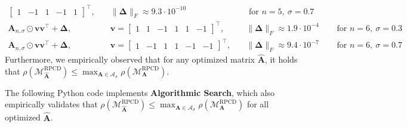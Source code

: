 \documentclass{article}
\theoremstyle{plain}
\theoremstyle{definition}
\theoremstyle{remark}
\def\vv{{\bm{v}}}
\def\mA{{\bm{A}}}
\begin{document}
\begin{align*}
\begin{bmatrix}
        1 & -1 & 1 & -1 & 1
    \end{bmatrix}^{\top}, &\quad \| \mathbf{\Delta} \|_F \approx 9.3\cdot 10^{-10} &\quad \text { for } n=5,~\sigma=0.7 \\ 
    \mA_{n, \sigma}\odot \vv \vv^{\top} + \mathbf{\Delta}, &\quad \vv=\begin{bmatrix}
        1 & 1 & -1 & 1 & 1 & -1
    \end{bmatrix}^{\top}, &\quad \| \mathbf{\Delta} \|_F \approx 1.9\cdot 10^{-4} &\quad \text { for } n=6,~\sigma=0.3 \\ 
    \mA_{n, \sigma}\odot \vv \vv^{\top} + \mathbf{\Delta}, &\quad \vv=\begin{bmatrix}
        1 & -1 & 1 & 1 & -1 & -1
    \end{bmatrix}^{\top}, &\quad \| \mathbf{\Delta} \|_F \approx 9.4\cdot 10^{-7} &\quad \text { for } n=6,~\sigma=0.7
\end{align*}
Furthermore, we empirically observed that for any optimized matrix $\widehat{\mA}$, it holds that $\rho(\mathcal{M}_{\widehat{\mA}}^{\text{RPCD}}) \le \max_{\mA \in \mathcal{A}_\sigma} \rho(\mathcal{M}_{\mA}^{\text{RPCD}})$.

The following Python code implements \textbf{Algorithmic Search}, which also empirically validates that $\rho(\mathcal{M}_{\widehat{\mA}}^{\text{RPCD}}) \le \max_{\mA \in \mathcal{A}_\sigma} \rho(\mathcal{M}_{\mA}^{\text{RPCD}})$ for all optimized $\widehat{\mA}$.
\end{document}
